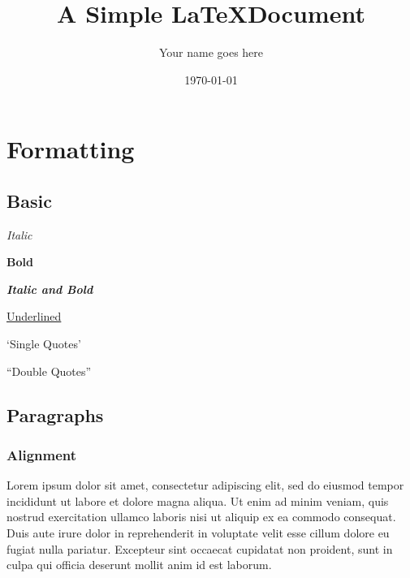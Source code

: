 \documentclass[11pt]{article} %
\title{\textbf{A Simple \LaTeX Document}}
\author{Your name goes here\\}
\date{\today}
\begin{document}
\maketitle %

\section{Formatting} %

\subsection{Basic} %
\begin{itemize} %
\begin{multicols}{2} %
	\item \textit{Italic}
	\item \textbf{Bold}
	\item \textbf{\textit{Italic and Bold}}
	\item \underline{Underlined}
	\item `Single Quotes'
	\item``Double Quotes''
\end{multicols}
\end{itemize}

\subsection{Paragraphs}
\subsubsection{Alignment}
\begin{flushleft} %
Lorem ipsum dolor sit amet, consectetur adipiscing elit, sed do eiusmod tempor incididunt ut labore et dolore magna aliqua. Ut enim ad minim veniam, quis nostrud exercitation ullamco laboris nisi ut aliquip ex ea commodo consequat. Duis aute irure dolor in reprehenderit in voluptate velit esse cillum dolore eu fugiat nulla pariatur. Excepteur sint occaecat cupidatat non proident, sunt in culpa qui officia deserunt mollit anim id est laborum.
\end{flushleft}
\end{document}
